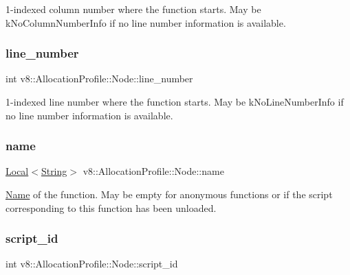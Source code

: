 1-\/indexed column number where the function starts. May be k\+No\+Column\+Number\+Info if no line number information is available. \mbox{\label{structv8_1_1AllocationProfile_1_1Node_ac9773c92a3af3a9a9420337599e68bd9}} 
\subsubsection{\texorpdfstring{line\+\_\+number}{line\_number}}
{\footnotesize\ttfamily int v8\+::\+Allocation\+Profile\+::\+Node\+::line\+\_\+number}

1-\/indexed line number where the function starts. May be k\+No\+Line\+Number\+Info if no line number information is available. \mbox{\label{structv8_1_1AllocationProfile_1_1Node_af9f2c323d6a11e836c02e8ac88adc5a8}} 
\subsubsection{\texorpdfstring{name}{name}}
{\footnotesize\ttfamily \mbox{\hyperlink{classv8_1_1Local}{Local}}$<$\mbox{\hyperlink{classv8_1_1String}{String}}$>$ v8\+::\+Allocation\+Profile\+::\+Node\+::name}

\mbox{\hyperlink{classv8_1_1Name}{Name}} of the function. May be empty for anonymous functions or if the script corresponding to this function has been unloaded. \mbox{\label{structv8_1_1AllocationProfile_1_1Node_a4a746de878d9ad42b32fda4c365b98fb}} 
\subsubsection{\texorpdfstring{script\+\_\+id}{script\_id}}
{\footnotesize\ttfamily int v8\+::\+Allocation\+Profile\+::\+Node\+::script\+\_\+id}

